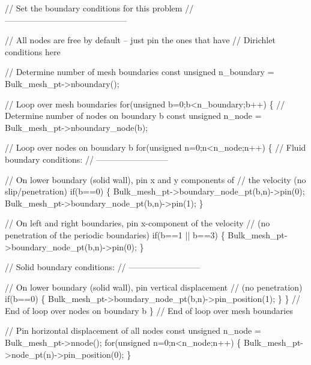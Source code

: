 \begin{DoxyCodeInclude}
 \textcolor{comment}{// Set the boundary conditions for this problem}
 \textcolor{comment}{// --------------------------------------------}

 \textcolor{comment}{// All nodes are free by default -- just pin the ones that have}
 \textcolor{comment}{// Dirichlet conditions here}

 \textcolor{comment}{// Determine number of mesh boundaries}
 \textcolor{keyword}{const} \textcolor{keywordtype}{unsigned} n\_boundary = Bulk\_mesh\_pt->nboundary();
 
 \textcolor{comment}{// Loop over mesh boundaries}
 \textcolor{keywordflow}{for}(\textcolor{keywordtype}{unsigned} b=0;b<n\_boundary;b++)
  \{
   \textcolor{comment}{// Determine number of nodes on boundary b}
   \textcolor{keyword}{const} \textcolor{keywordtype}{unsigned} n\_node = Bulk\_mesh\_pt->nboundary\_node(b);

   \textcolor{comment}{// Loop over nodes on boundary b}
   \textcolor{keywordflow}{for}(\textcolor{keywordtype}{unsigned} n=0;n<n\_node;n++)
    \{
     \textcolor{comment}{// Fluid boundary conditions:}
     \textcolor{comment}{// --------------------------}

     \textcolor{comment}{// On lower boundary (solid wall), pin x and y components of}
     \textcolor{comment}{// the velocity (no slip/penetration)}
     \textcolor{keywordflow}{if}(b==0)
      \{
       Bulk\_mesh\_pt->boundary\_node\_pt(b,n)->pin(0);
       Bulk\_mesh\_pt->boundary\_node\_pt(b,n)->pin(1);
      \}

     \textcolor{comment}{// On left and right boundaries, pin x-component of the velocity}
     \textcolor{comment}{// (no penetration of the periodic boundaries)}
     \textcolor{keywordflow}{if}(b==1 || b==3)
      \{
       Bulk\_mesh\_pt->boundary\_node\_pt(b,n)->pin(0);
      \}

     \textcolor{comment}{// Solid boundary conditions:}
     \textcolor{comment}{// --------------------------}

     \textcolor{comment}{// On lower boundary (solid wall), pin vertical displacement}
     \textcolor{comment}{// (no penetration)}
     \textcolor{keywordflow}{if}(b==0)
      \{
       Bulk\_mesh\_pt->boundary\_node\_pt(b,n)->pin\_position(1);
      \}
    \} \textcolor{comment}{// End of loop over nodes on boundary b}
  \} \textcolor{comment}{// End of loop over mesh boundaries}

 \textcolor{comment}{// Pin horizontal displacement of all nodes}
 \textcolor{keyword}{const} \textcolor{keywordtype}{unsigned} n\_node = Bulk\_mesh\_pt->nnode();
 \textcolor{keywordflow}{for}(\textcolor{keywordtype}{unsigned} n=0;n<n\_node;n++) \{ Bulk\_mesh\_pt->node\_pt(n)->pin\_position(0); \}

\end{DoxyCodeInclude}


